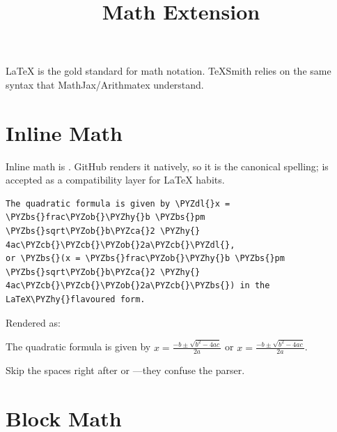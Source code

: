 \documentclass[a4paper,twoside]{article}
\title{Math Extension}
\author{}\date{}
\begin{document}
\maketitle
\LaTeX{} is the gold standard for math notation. TeXSmith relies on the same syntax that MathJax/Arithmatex understand.
\section{Inline Math}
Inline math is . GitHub renders it natively, so it is the canonical
spelling;  is accepted as a compatibility layer for \LaTeX{} habits.
\begin{tscode}[lang=md, engine=pygments]
\begin{Verbatim}[commandchars=\\\{\},breaklines, breakanywhere, commandchars=\\\{\}]
The quadratic formula is given by \PYZdl{}x = \PYZbs{}frac\PYZob{}\PYZhy{}b \PYZbs{}pm \PYZbs{}sqrt\PYZob{}b\PYZca{}2 \PYZhy{} 4ac\PYZcb{}\PYZcb{}\PYZob{}2a\PYZcb{}\PYZdl{},
or \PYZbs{}(x = \PYZbs{}frac\PYZob{}\PYZhy{}b \PYZbs{}pm \PYZbs{}sqrt\PYZob{}b\PYZca{}2 \PYZhy{} 4ac\PYZcb{}\PYZcb{}\PYZob{}2a\PYZcb{}\PYZbs{}) in the LaTeX\PYZhy{}flavoured form.
\end{Verbatim}
\end{tscode}
Rendered as:
\begin{displayquote}
The quadratic formula is given by $x = \frac{-b \pm \sqrt{b^2 - 4ac}}{2a}$
or $x = \frac{-b \pm \sqrt{b^2 - 4ac}}{2a}$.
\end{displayquote}
\begin{tscallout}[kind=note]
Skip the spaces right after \tscodeinline{\$} or \tscodeinline{\textbackslash{}(}---they confuse the parser.
\end{tscallout}
\section{Block Math}
\end{document}
